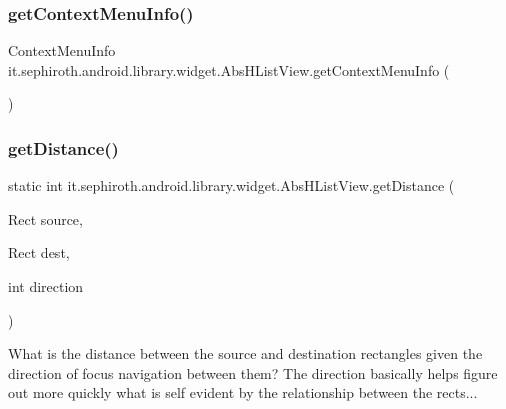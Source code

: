\subsubsection{\texorpdfstring{get\+Context\+Menu\+Info()}{getContextMenuInfo()}}
{\footnotesize\ttfamily Context\+Menu\+Info it.\+sephiroth.\+android.\+library.\+widget.\+Abs\+H\+List\+View.\+get\+Context\+Menu\+Info (\begin{DoxyParamCaption}{ }\end{DoxyParamCaption})\hspace{0.3cm}{\ttfamily [protected]}}

\mbox{\label{classit_1_1sephiroth_1_1android_1_1library_1_1widget_1_1_abs_h_list_view_a3d6b7c8dfbeb4926a5a3c4bd12acf0ce}} 
\subsubsection{\texorpdfstring{get\+Distance()}{getDistance()}}
{\footnotesize\ttfamily static int it.\+sephiroth.\+android.\+library.\+widget.\+Abs\+H\+List\+View.\+get\+Distance (\begin{DoxyParamCaption}\item[{Rect}]{source,  }\item[{Rect}]{dest,  }\item[{int}]{direction }\end{DoxyParamCaption})\hspace{0.3cm}{\ttfamily [static]}}

What is the distance between the source and destination rectangles given the direction of focus navigation between them? The direction basically helps figure out more quickly what is self evident by the relationship between the rects...



